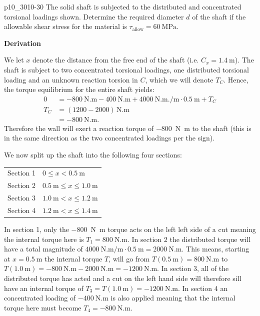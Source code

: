 \documentclass[a4paper]{article}
\newcounter{problem}
\numberwithin{equation}{problem}
\newcommand{\AUheading}[1]{%
  \par\vspace{.4\baselineskip}%
  {\sffamily\bfseries\color{AUblueDark}#1\par}%
  \nobreak%
}
\newenvironment{derivation}[1][Derivation]{%
  \AUheading{#1}
  \begingroup\allowdisplaybreaks
  \setlength{\abovedisplayskip}{6pt}%
  \setlength{\belowdisplayskip}{6pt}%
  \setlength{\abovedisplayshortskip}{4pt}%
  \setlength{\belowdisplayshortskip}{4pt}%
}{\par\endgroup\medskip}
\begin{document}


\begin{problemwithimage}{p10_30}{10-30}
  The solid shaft is subjected to the distributed and concentrated torsional loadings shown.
  Determine the required diameter $d$ of the shaft if the allowable shear stress for the material is $\tau_{\text{allow}} = \qty{60}{\MPa}$.
\end{problemwithimage}

\begin{derivation}
  We let $x$ denote the distance from the free end of the shaft (i.e. $C_x = \qty{1,4}{\m} $).
  The shaft is subject to two concentrated torsional loadings, one distributed torsional loading and an unknown reaction torsion in $C$, which we will denote $T_C$.
  Hence, the torque equilibrium for the entire shaft yields:
  \begin{align*}
    0 &= \qty{-800}{\N.\m} - \qty{400}{\N.\m} + \qty{4000}{\N.\m.\per\m} \cdot \qty{0,5}{\m} + T_C  \\
    T_C &= \left( \num{1200} - \num{2000}  \right) \, \unit{\N.\m} \\
        &= \qty{-800}{\N.\m} 
  .\end{align*}
  Therefore the wall will exert a reaction torque of \qty{-800}{\N.\m} to the shaft (this is in the same direction as the two concentrated loadings per the sign).

  We now split up the shaft into the following four sections:

  \begin{tabular}{ll}
    Section 1 & $0 \leq x < \qty{0,5}{\m}$ \\
    Section 2 & $\qty{0,5}{\m} \leq x \leq \qty{1,0}{\m}$ \\
    Section 3 & $\qty{1,0}{\m} < x \leq \qty{1,2}{\m}$ \\
    Section 4 & $\qty{1,2}{\m} < x \leq \qty{1,4}{\m}$
  \end{tabular}
  
  In section 1, only the \qty{-800}{\N.\m} torque acts on the left left side of a cut meaning the internal torque here is $T_1 = \qty{800}{\N.\m}$.
  In section 2 the distributed torque will have a total magnitude of $\qty{4000}{\N.\m\per\m} \cdot \qty{0,5}{\m} = \qty{2000}{\N.\m}$.
  This means, starting at $x= \qty{0,5}{\m}$ the internal torque $T$, will go from $T(\qty{0,5}{\m} ) = \qty{800}{\N.\m}$ to $T(\qty{1,0}{\m}) = \qty{-800}{\N.\m} - \qty{2000}{\N.\m} = \qty{-1200}{\N.\m}$.
  In section 3, all of the distributed torque has acted and a cut on the left hand side will therefore sill have an internal torque of $T_3 = T(\qty{1,0}{\m}) = \qty{-1200}{\N.\m}$.
  In section 4 an concentrated loading of $\qty{-400}{\N.\m}$ is also applied meaning that the internal torque here must become $T_4 = \qty{-800}{\N.\m}$.


\end{derivation}
\end{document}
